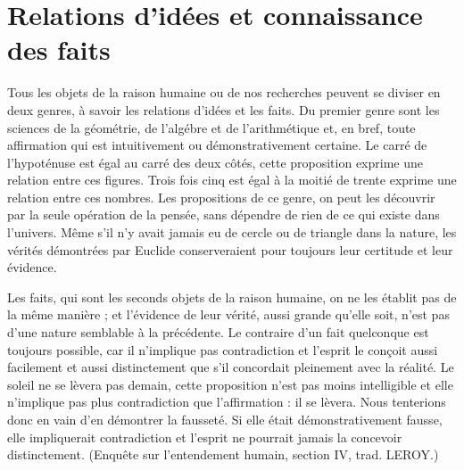 
\section{Relations d'idées et connaissance des faits}

Tous les objets de la raison humaine ou de nos recherches
peuvent se diviser en deux genres, à savoir les relations
d’idées et les faits. Du premier genre sont les sciences de
la géométrie, de l’algébre et de l’arithmétique et, en bref,
toute affirmation qui est intuitivement ou démonstrativement
certaine. Le carré de l'hypoténuse est égal au
carré des deux côtés, cette proposition exprime une relation
entre ces figures. Trois fois cinq est égal à la moitié
de trente exprime une relation entre ces nombres. Les
propositions de ce genre, on peut les découvrir par la
seule opération de la pensée, sans dépendre de rien de ce
qui existe dans l’univers. Même s’il n’y avait jamais eu
de cercle ou de triangle dans la nature, les vérités démontrées
par Euclide conserveraient pour toujours leur certitude
et leur évidence.

Les faits, qui sont les seconds objets de la raison humaine,
on ne les établit pas de la même manière ; et l’évidence de
leur vérité, aussi grande qu’elle soit, n’est pas d’une
nature semblable à la précédente. Le contraire d’un fait
quelconque est toujours possible, car il n’implique pas
contradiction et l'esprit le conçoit aussi facilement et
aussi distinctement que s’il concordait pleinement avec
la réalité. Le soleil ne se lèvera pas demain, cette proposition
n’est pas moins intelligible et elle n’implique pas
plus contradiction que l'affirmation : il se lèvera. Nous
tenterions donc en vain d’en démontrer la fausseté. Si
elle était démonstrativement fausse, elle impliquerait
contradiction et l'esprit ne pourrait jamais la concevoir
distinctement. (Enquête sur l’entendement humain, section
IV, trad. L{\footnotesize EROY}.)


